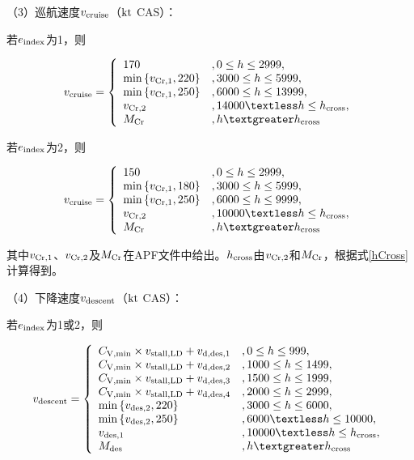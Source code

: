 \documentclass[a4paper,punct,space,heading=true,AutoFakeBold]{ctexrep}
\begin{document}
（3）巡航速度$v_{\rm cruise}$（$\rm kt$ CAS）：

若$e_{\rm index}$为1，则

\begin{equation}
v_{\rm cruise}=\left\{\begin{array}{ll}
170   &   , 0\leq h\leq 2999,\\
{\rm min}\left\{ v_{\rm Cr,1},220\right\}   &   , 3000\leq h\leq 5999,\\
{\rm min}\left\{ v_{\rm Cr,1},250\right\}   &   , 6000\leq h\leq 13999,\\
v_{\rm Cr,2}   &   , 14000\textless h\leq h_{\rm cross},\\
M_{\rm Cr}   &   , h\textgreater h_{\rm cross}
\end{array}\right.
\end{equation}

若$e_{\rm index}$为2，则

\begin{equation}
v_{\rm cruise}=\left\{\begin{array}{ll}
150   &   , 0\leq h\leq 2999,\\
{\rm min}\left\{ v_{\rm Cr,1},180\right\}   &   , 3000\leq h\leq 5999,\\
{\rm min}\left\{ v_{\rm Cr,1},250\right\}   &   , 6000\leq h\leq 9999,\\
v_{\rm Cr,2}   &   , 10000\textless h\leq h_{\rm cross},\\
M_{\rm Cr}   &   , h\textgreater h_{\rm cross}
\end{array}\right.
\end{equation}

其中$v_{\rm Cr,1}$、$v_{\rm Cr,2}$及$M_{\rm Cr}$在APF文件中给出。$h_{\rm cross}$由$v_{\rm Cr,2}$和$M_{\rm Cr}$，根据式\ref{hCross}计算得到。

（4）下降速度$v_{\rm descent}$（$\rm kt$ CAS）：

若$e_{\rm index}$为1或2，则

\begin{equation}\label{vdescent1}
v_{\rm descent}=\left\{\begin{array}{ll}
C_{\rm V,min}\times v_{\rm stall,LD}+v_{\rm d,des,1}   &   , 0\leq h\leq 999,\\
C_{\rm V,min}\times v_{\rm stall,LD}+v_{\rm d,des,2}   &   , 1000\leq h\leq 1499,\\
C_{\rm V,min}\times v_{\rm stall,LD}+v_{\rm d,des,3}   &   , 1500\leq h\leq 1999,\\
C_{\rm V,min}\times v_{\rm stall,LD}+v_{\rm d,des,4}   &   , 2000\leq h\leq 2999,\\
{\rm min}\left\{ v_{\rm des,2},220\right\}   &   , 3000\leq h\leq 6000,\\
{\rm min}\left\{ v_{\rm des,2},250\right\}   &   , 6000\textless h\leq 10000,\\
v_{\rm des,1}   &   , 10000\textless h\leq h_{\rm cross},\\
M_{\rm des}   &   , h\textgreater h_{\rm cross}
\end{array}\right.
\end{equation}
\end{document}
